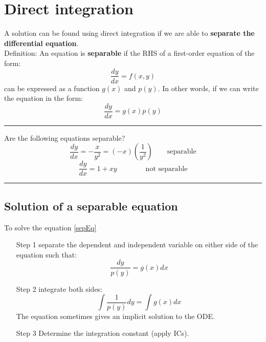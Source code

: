 \section{Direct integration}
A solution can be found using direct integration if we are able to \textbf{separate the differential equation}.\\

Definition: An equation is \textbf{separable} if the RHS of a first-order equation of the form:
\begin{equation}
\frac{dy}{dx}=f(x,y)
\end{equation}
can be expressed as a function $g(x)$ and $p(y)$. In other words, if we can write the equation in the form:
\begin{equation}
\frac{dy}{dx}=g(x)p(y)
\label{sepEq}
\end{equation}

\begin{center}
\noindent\rule{4cm}{0.4pt}
\end{center}

\begin{exmp}{} Are the following equations separable?
\begin{equation*}
\frac{dy}{dx}=-\frac{x}{y^2}= \left(-x\right)\left(\frac{1}{y^2}\right) \qquad \text{separable}
\end{equation*}
\begin{equation*}
\frac{dy}{dx}=1+xy \qquad \qquad \text{not separable}
\end{equation*}
\end{exmp}
\begin{center}
\noindent\rule{4cm}{0.4pt}
\end{center}


\subsection*{Solution of a separable equation}
To solve the equation \eqref{sepEq}
\begin{enumerate}

\item[Step 1] separate the dependent and independent variable on either side of the equation such that:
\begin{equation}
\frac{dy}{p(y)}=g(x){dx}
\end{equation}
\item[Step 2] integrate both sides:
\begin{equation}
\int{\frac{1}{p(y)}dy}=\int{g(x){dx}}
\end{equation}
The equation sometimes gives an implicit solution to the ODE.
\item[Step 3] Determine the integration constant (apply ICs).
\end{enumerate}

